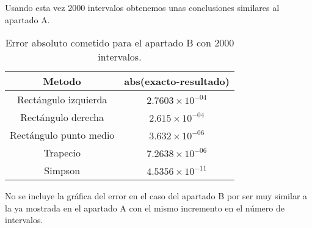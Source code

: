 Usando esta vez 2000 intervalos obtenemos unas conclusiones similares al apartado A.
\begin{table}
\begin{center}
\begin{tabular}{ |c|c| } 
 \hline 
 Metodo & abs(exacto-resultado) \\ 
 \hline \hline
 Rectángulo izquierda &  $2.7603\times10^{-04}$ \\ 
 \hline
 Rectángulo derecha &  $2.615\times10^{-04}$ \\ 
 \hline
 Rectángulo punto medio &  $3.632\times10^{-06}$ \\ 
 \hline
 Trapecio &  $7.2638\times10^{-06}$ \\ 
 \hline
 Simpson &  $4.5356\times10^{-11}$ \\ 
 \hline
\end{tabular}
\end{center}
\caption{Error absoluto cometido para el apartado B con 2000 intervalos.}
\end{table}

No se incluye la gráfica del error en el caso del apartado B por ser muy similar a la ya mostrada en el apartado A con el mismo incremento en el número de intervalos.